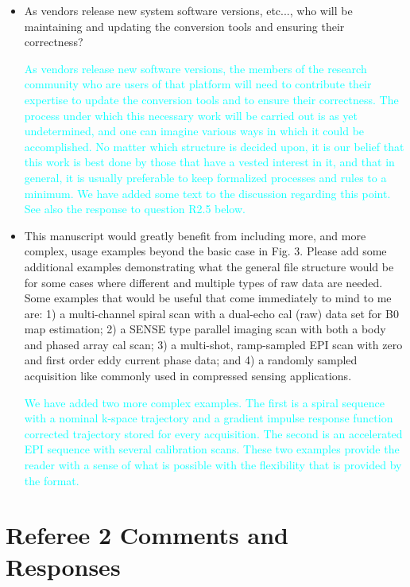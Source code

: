\documentclass[12pt, draft]{article}
\makeatletter
\def\namedlabel#1#2{\begingroup#2\def\@currentlabel{#2}\phantomsection\label{#1}\endgroup}
\newcommand{\question}[1]{\item[\namedlabel{q#1}{#1}]}
\newcommand{\response}[1]{\textcolor{cyan}{#1}}
\makeatother
\begin{document}
{\begin{itemize}
\question{R1.6} As vendors release new system software versions, etc..., who will be maintaining and updating the conversion tools and ensuring their correctness?

\response{As vendors release new software versions, the members of the research community who are users of that platform will need to contribute their expertise to update the conversion tools and to ensure their correctness. The process under which this necessary work will be carried out is as yet undetermined, and one can imagine various ways in which it could be accomplished.  No matter which structure is decided upon, it is our belief that this work is best done by those that have a vested interest in it, and that in general, it is usually preferable to keep formalized processes and rules to a minimum. We have added some text to the discussion regarding this point.  See also the response to question R2.5 below.}

\question{R1.7} This manuscript would greatly benefit from including more, and more complex, usage examples beyond the basic case in Fig. 3. Please add some additional examples demonstrating what the general file structure would be for some cases where different and multiple types of raw data are needed. Some examples that would be useful that come immediately to mind to me are: 1) a multi-channel spiral scan with a dual-echo cal (raw) data set for B0 map estimation; 2) a SENSE type parallel imaging scan with both a body and phased array cal scan; 3) a multi-shot, ramp-sampled EPI scan with zero and first order eddy current phase data; and 4) a randomly sampled acquisition like commonly used in compressed sensing applications.

\response{We have added two more complex examples.  The first is a spiral sequence with a nominal k-space trajectory and a gradient impulse response function corrected trajectory stored for every acquisition.  The second is an accelerated EPI sequence with several calibration scans.  These two examples provide the reader with a sense of what is possible with the flexibility that is provided by the format.}

\end{itemize}

\section*{Referee 2 Comments and Responses}
}
\end{document}
